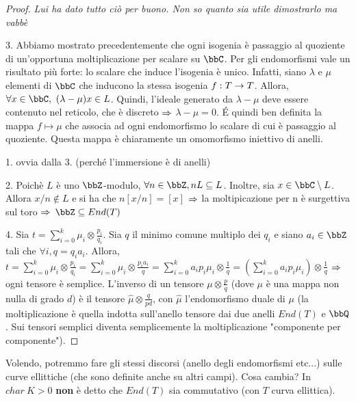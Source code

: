 \begin{proof} {\it Lui ha dato tutto ciò per buono. Non so quanto sia utile dimostrarlo ma vabbè}
  
3. Abbiamo mostrato precedentemente che ogni isogenia è passaggio al quoziente di un'opportuna moltiplicazione per scalare su $\bbC$. Per gli endomorfismi vale un risultato più forte: lo scalare che induce l'isogenia è unico.
Infatti, siano $\lambda$ e $\mu$ elementi di $\bbC$ che inducono la stessa isogenia $f:T\rightarrow T$. Allora, $\forall x\in \bbC,  \ (\lambda - \mu)x \in L$. Quindi, l'ideale generato da $\lambda -\mu$ deve essere contenuto nel reticolo, che è discreto $\Rightarrow$ $\lambda - \mu = 0$. \'E quindi ben definita la mappa $f \mapsto \mu$ che associa ad ogni endomorfismo lo scalare di cui è passaggio al quoziente. Questa mappa è chiaramente un omomorfismo iniettivo di anelli.

1. ovvia dalla 3. (perché l'immersione è di anelli)

2. Poichè $L$ è uno $\bbZ$-modulo, $\forall n \in \bbZ, nL\subseteq L$. Inoltre, sia $x\in \bbC \setminus L$. Allora $x/n \not\in L$ e si ha che $n[x/n]=[x]$ $\Rightarrow$ la moltipicazione per n è surgettiva sul toro $\Rightarrow$ $\bbZ \subseteq End(T)$

4. Sia $t=\sum\limits_{i=0}^{k} \mu_{i} \otimes \frac{p_{i}}{q_{i}}$. Sia $q$ il minimo comune multiplo dei $q_{i}$ e siano $a_{i} \in \bbZ$ tali che $\forall i, q=q_{i}a_{i}$. Allora,\\
$t=\sum\limits_{i=0}^{k} \mu_{i}\otimes \frac{p_{i}}{q_{i}} = \sum\limits_{i=0}^{k} \mu_{i} \otimes \frac{p_{i}a_{i}}{q}= \sum\limits_{i=0}^{k} a_{i}p_{i}\mu_{i}\otimes \frac{1}{q} = (\sum\limits_{i=0}^{k} a_{i}p_{i}\mu_{i})\otimes \frac{1}{q}$ $\Rightarrow$ ogni tensore è semplice. L'inverso di un tensore $\mu \otimes \frac{p}{q}$ (dove $\mu$ è una mappa non nulla di grado $d$) è il tensore $\hat{\mu} \otimes \frac{q}{pd}$, con $\hat{\mu}$ l'endomorfismo duale di $\mu$ (la moltiplicazione è quella indotta sull'anello tensore dai due anelli $End(T)$ e $\bbQ$. Sui tensori semplici diventa semplicemente la moltiplicazione "componente per componente").
\end{proof}

Volendo, potremmo fare gli stessi discorsi (anello degli endomorfismi etc...) sulle curve ellittiche (che sono definite anche su altri campi). Cosa cambia? In $char \ K >0$ {\bf non } è detto che $End(T)$ sia commutativo (con $T$ curva ellittica).

